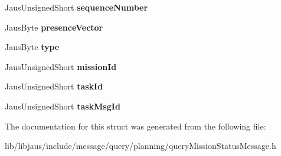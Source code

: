 \begin{DoxyCompactItemize}
\item 
\hypertarget{struct_query_mission_status_message_struct_ab40e7e62af8f00c0834c8e91fc5f0619}{\-Jaus\-Unsigned\-Short {\bfseries sequence\-Number}}\label{struct_query_mission_status_message_struct_ab40e7e62af8f00c0834c8e91fc5f0619}

\item 
\hypertarget{struct_query_mission_status_message_struct_a7323382f50779480e38aca12e95d1881}{\-Jaus\-Byte {\bfseries presence\-Vector}}\label{struct_query_mission_status_message_struct_a7323382f50779480e38aca12e95d1881}

\item 
\hypertarget{struct_query_mission_status_message_struct_a16b2be631221f0b0692703352a3bcf29}{\-Jaus\-Byte {\bfseries type}}\label{struct_query_mission_status_message_struct_a16b2be631221f0b0692703352a3bcf29}

\item 
\hypertarget{struct_query_mission_status_message_struct_a33110365c5efe0f9703b94d50d17246b}{\-Jaus\-Unsigned\-Short {\bfseries mission\-Id}}\label{struct_query_mission_status_message_struct_a33110365c5efe0f9703b94d50d17246b}

\item 
\hypertarget{struct_query_mission_status_message_struct_a3d8521415452892911b41a78f2182821}{\-Jaus\-Unsigned\-Short {\bfseries task\-Id}}\label{struct_query_mission_status_message_struct_a3d8521415452892911b41a78f2182821}

\item 
\hypertarget{struct_query_mission_status_message_struct_af60fc0c0e10bd5d0edad41f0be9f2961}{\-Jaus\-Unsigned\-Short {\bfseries task\-Msg\-Id}}\label{struct_query_mission_status_message_struct_af60fc0c0e10bd5d0edad41f0be9f2961}

\end{DoxyCompactItemize}


\-The documentation for this struct was generated from the following file\-:\begin{DoxyCompactItemize}
\item 
lib/libjaus/include/message/query/planning/query\-Mission\-Status\-Message.\-h\end{DoxyCompactItemize}
